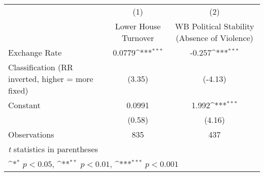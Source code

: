 {
\def\sym#1{\ifmmode^{#1}\else\(^{#1}\)\fi}
\begin{tabular}{l*{2}{c}}
\toprule
                &\multicolumn{1}{c}{(1)}&\multicolumn{1}{c}{(2)}\\
                &\multicolumn{1}{c}{Lower House Turnover}&\multicolumn{1}{c}{WB Political Stability (Absence of Violence)}\\
\midrule
Exchange Rate   &   0.0779\sym{***}&   -0.257\sym{***}\\
Classification (RR inverted, higher = more fixed)&   (3.35)         &  (-4.13)         \\
\addlinespace
Constant        &   0.0991         &    1.992\sym{***}\\
                &   (0.58)         &   (4.16)         \\
\midrule
Observations    &      835         &      437         \\
\bottomrule
\multicolumn{3}{l}{\footnotesize \textit{t} statistics in parentheses}\\
\multicolumn{3}{l}{\footnotesize \sym{*} \(p<0.05\), \sym{**} \(p<0.01\), \sym{***} \(p<0.001\)}\\
\end{tabular}
}
